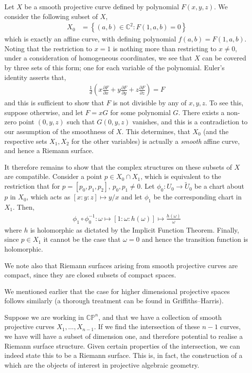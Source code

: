 Let $ X $ be a smooth projective curve defined by polynomial $ F(x,y,z) $. We
consider the following subset of $ X $,
\begin{align*}
	X_0 & = \left\{ (a,b) \in \mathbb{C}^{2}: F(1,a,b)=0 \right\}
\end{align*}
which is exactly an affine curve, with defining polynomial $ f(a,b) = F(1,a,b)
$. Noting that the restriction to $ x=1 $ is nothing more than restricting to $
	x \neq 0 $, under a consideration of homogeneous coordinates, we see that $ X $
can be covered by three sets of this form; one for each variable of the
polynomial. Euler's identity asserts that,
\begin{align*}
	\frac{1}{d}\left( x \frac{\partial F}{\partial x} + y\frac{\partial
		F}{\partial y} + z \frac{\partial F}{\partial z} \right) = F
\end{align*}
and this is sufficient to show that $ F $ is not divisible by any of $ x,y,z $.
To see this, suppose otherwise, and let $ F = x G $ for some polynomial $ G $.
There exists a non-zero point $ (0,y,z) $ such that $ G(0,y,z) $
vanishes, and this is
a contradiction to our assumption of the smoothness of $ X $. This determines,
that $ X_0 $ (and the respective sets $ X_1, X_2 $ for the other variables) is
actually a \textit{smooth} affine curve, and hence a Riemann surface.

It therefore remains to show that the complex structures on these subsets of $ X
$ are compatible. Consider a point $ p \in X_0 \cap X_1 $, which is equivalent
to the restriction that for $ p = [p_0, p_1, p_2] $, $ p_0, p_1 \neq 0 $. Let $
	\phi_0:U_0 \to \tilde{U}_{0} $ be a chart about $ p $ in $ X_0 $, which acts as
$ [x:y:z] \mapsto y/x $ and let $ \phi_1 $ be the corresponding chart in $ X_1 $.
Then,
\begin{align*}
	\phi_1 \circ \phi_0 ^{-1}: \omega \mapsto [1:\omega:h(\omega)] \mapsto \frac{h(\omega)}{\omega}
\end{align*}
where $ h $ is holomorphic as dictated by the Implicit Function Theorem.
Finally, since $ p \in X_1 $ it cannot be the case that $ \omega = 0 $ and hence
the transition function is holomorphic.

We note also that Riemann surfaces arising from smooth projective curves are
compact, since they are closed subsets of compact spaces.

\begin{remark}
	We mentioned earlier that the case for higher dimensional projective spaces
	follows similarly (a thorough treatment can be found in
	Griffiths--Harris\sidenotemark).

	Suppose we are working in $ \mathbb{C}\mathbb{P}^{n} $, and that we have a
	collection of smooth projective curves $ X_1,...,X _{n-1} $. If we find the
	intersection of these $ n-1 $ curves, we have will have a subset of dimension
	one, and therefore potential to realise a Riemann surface structure. Given
	certain properties of the intersection, we can indeed state this to be a
	Riemann surface. This is, in fact, the construction of a  which are the objects of interest in projective algebraic geometry.
\end{remark}
